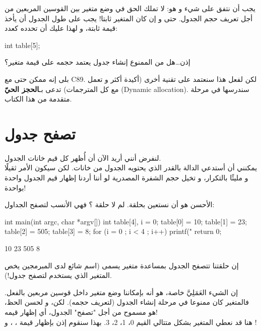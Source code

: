 يجب أن نتفق على شيء و هو: لا تملك الحق في وضع متغير بين القوسين المربعين من أجل تعريف حجم الجدول. حتى و إن كان المتغير ثابتا! يجب على طول الجدول أن يأخذ قيمة ثابتة، و لهذا عليك أن تحدده كعدد:
\begin{Csource}
int table[5];
\end{Csource}

\begin{question}
   إذن\dots هل من الممنوع إنشاء جدول يعتمد حجمه على قيمة متغير؟
\end{question}

بلى إنه ممكن حتى مع
\textenglish{C89}.
لكن لفعل هذا سنعتمد على تقنية أخرى (أكيدة أكثر و تعمل مع كل المترجمات) تدعى بـ\textbf{الحجز الحيّ}
(\textenglish{Dynamic allocation}).
سندرسها في مرحلة متقدمة من هذا الكتاب.

\section{تصفح جدول}

لنفرض أنني أريد الآن أن أُظهر كل قيم خانات الجدول.\\
يمكنني أن أستدعي الدالة
بالقدر الذي يحتويه الجدول من خانات. لكن سيكون الأمر ثقيلًا و مليئًا بالتكرار، و تخيل حجم الشفرة المصدرية لو أننا أردنا إظهار قيم الجدول واحدة بواحدة!

الأحسن هو أن نستعين بحلقة. لم لا حلقة
؟ فهي الأنسب لتصفح الجداول:

\begin{Csource}
int main(int argc, char *argv[])
{
	int table[4], i = 0;
	table[0] = 10;
	table[1] = 23;
	table[2] = 505;
	table[3] = 8;
	for (i = 0 ; i < 4 ; i++)
	{
    		printf("%
	}
	return 0;
}
\end{Csource}

\begin{Console}
10
23
505
8
\end{Console}

إن حلقتنا تتصفح الجدول بمساعدة متغير يسمى
(اسم شائع لدى المبرمجين يخص المتغير الذي يستخدم لتصفح جدول!).

إن الشيء العَمَلِيَّ خاصة، هو أنه بإمكاننا وضع متغير داخل قوسين مربعين بالفعل. فالمتغير كان ممنوعا في مرحلة إنشاء الجدول (لتعريف حجمه). لكن، و لحسن الحظ، هو مسموح من أجل "تصفح" الجدول، أي إظهار قيمه!\\
هنا قد نعطي المتغير
بشكل متتالي القيم 0، 1، 2، 3. بهذا سنقوم إذن بإظهار قيمة
،
،
و
!

